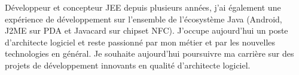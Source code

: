 \par{
Développeur et concepteur JEE depuis plusieurs années, j'ai également une expérience de développement sur l'ensemble de l'écosystème Java (Android, J2ME sur PDA et Javacard sur chipset NFC). J'occupe aujourd'hui un poste d'architecte logiciel et reste passionné par mon métier et par les nouvelles technologies en général. Je souhaite aujourd'hui poursuivre ma carrière sur des projets de développement innovants en qualité d'architecte logiciel.
}